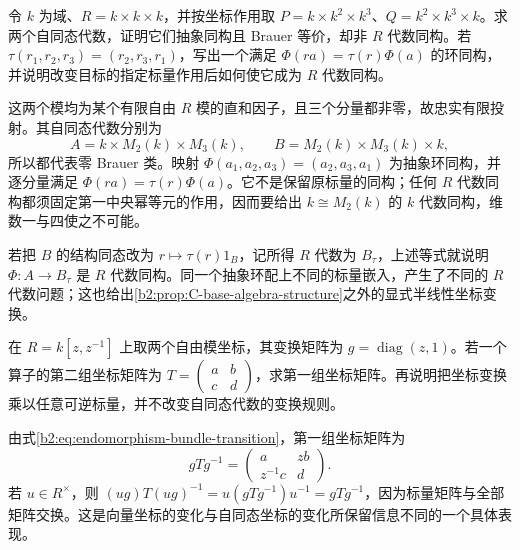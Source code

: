 \begin{exercise}\label{b2:ex:C-base-ring-isomorphism}
	令 \(k\) 为域、\(R=k\times k\times k\)，并按坐标作用取 \(P=k\times k^2\times k^3\)、\(Q=k^2\times k^3\times k\)。求两个自同态代数，证明它们抽象同构且 Brauer 等价，却非 \(R\) 代数同构。若 \(\tau(r_1,r_2,r_3)=(r_2,r_3,r_1)\)，写出一个满足 \(\Phi(ra)=\tau(r)\Phi(a)\) 的环同构，并说明改变目标的指定标量作用后如何使它成为 \(R\) 代数同构。
\end{exercise}
\begin{solution}
	这两个模均为某个有限自由 \(R\) 模的直和因子，且三个分量都非零，故忠实有限投射。其自同态代数分别为
	\[
		A=k\times M_2(k)\times M_3(k),\qquad B=M_2(k)\times M_3(k)\times k,
	\]
	所以都代表零 Brauer 类。映射 \(\Phi(a_1,a_2,a_3)=(a_2,a_3,a_1)\) 为抽象环同构，并逐分量满足 \(\Phi(ra)=\tau(r)\Phi(a)\)。它不是保留原标量的同构；任何 \(R\) 代数同构都须固定第一中央幂等元的作用，因而要给出 \(k\cong M_2(k)\) 的 \(k\) 代数同构，维数一与四使之不可能。

	若把 \(B\) 的结构同态改为 \(r\mapsto\tau(r)1_B\)，记所得 \(R\) 代数为 \(B_\tau\)，上述等式就说明 \(\Phi:A\rightarrow B_\tau\) 是 \(R\) 代数同构。同一个抽象环配上不同的标量嵌入，产生了不同的 \(R\) 代数问题；这也给出\cref{b2:prop:C-base-algebra-structure}之外的显式半线性坐标变换。
\end{solution}

\begin{exercise}\label{b2:ex:C-transition-conjugation}
	在 \(R=k[z,z^{-1}]\) 上取两个自由模坐标，其变换矩阵为 \(g=\operatorname{diag}(z,1)\)。若一个算子的第二组坐标矩阵为 \(T=\begin{pmatrix}a&b\\c&d\end{pmatrix}\)，求第一组坐标矩阵。再说明把坐标变换乘以任意可逆标量，并不改变自同态代数的变换规则。
\end{exercise}
\begin{solution}
	由式\eqref{b2:eq:endomorphism-bundle-transition}，第一组坐标矩阵为
	\[
		gTg^{-1}=\begin{pmatrix}a&zb\\z^{-1}c&d\end{pmatrix}.
	\]
	若 \(u\in R^\times\)，则 \((ug)T(ug)^{-1}=u(gTg^{-1})u^{-1}=gTg^{-1}\)，因为标量矩阵与全部矩阵交换。这是向量坐标的变化与自同态坐标的变化所保留信息不同的一个具体表现。
\end{solution}


